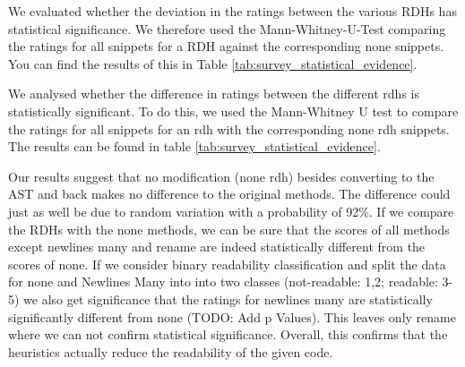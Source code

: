 \documentclass[%
class=scrreprt,
chapterprefix=false,%
open=right,%
twoside=false,%
paper=a4,%
logofile={Logo\_zentral\_farbig\_EN.png},%
thesistype=master,%
UKenglish,%
]{se2thesis}
\theoremstyle{definition}
\begin{document}
	We evaluated whether the deviation in the ratings between the various RDHs has statistical significance. We therefore used the Mann-Whitney-U-Test comparing the ratings for all snippets for a RDH against the corresponding none snippets. You can find the results of this in Table \ref{tab:survey_statistical_evidence}.
	
	We analysed whether the difference in ratings between the different rdhs is statistically significant. To do this, we used the Mann-Whitney U test to compare the ratings for all snippets for an rdh with the corresponding none rdh snippets. The results can be found in table \ref{tab:survey_statistical_evidence}.
		
	Our results suggest that no modification (none rdh) besides converting to the AST and back makes no difference to the original methods. The difference could just as well be due to random variation with a probability of 92\%. If we compare the RDHs with the none methods, we can be sure that the scores of all methods except newlines many and rename are indeed statistically different from the scores of none. If we consider binary readability classification and split the data for none and Newlines Many into into two classes (not-readable: 1,2; readable: 3-5) we also get significance that the ratings for newlines many are statistically significantly different from none (TODO: Add p Values). This leaves only rename where we can not confirm statistical significance. Overall, this confirms that the heuristics actually reduce the readability of the given code.
	
	
\end{document}
